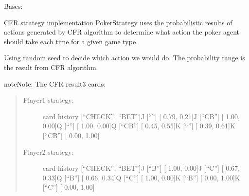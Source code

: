 \documentclass[letterpaper,10pt,english]{sphinxmanual}
\begin{document}
\begin{fulllineitems}
\label{\detokenize{strategy:strategy.agent_strategy.PokerStrategy}}
\pysigstartsignatures
{}
\pysigstopsignatures
\sphinxAtStartPar
Bases: {\hyperref[\detokenize{strategy:strategy.base_strategy.StrategyBase}]{}}

\sphinxAtStartPar
CFR strategy implementation
PokerStrategy uses the probabilistic results of actions generated by CFR algorithm
to determine what action the poker agent should take each time for a given game type.

\begin{fulllineitems}
\label{\detokenize{strategy:strategy.agent_strategy.PokerStrategy.card3strategy}}
\pysigstartsignatures
{}
\pysigstopsignatures
\sphinxAtStartPar
Using random seed to decide which action we would do. The probability range is the result from CFR algorithm.

\begin{sphinxadmonition}{note}{Note:}
\sphinxAtStartPar
The CFR result3 cards:
\begin{quote}
\begin{description}
\item[{Player1 strategy:}] \leavevmode
\sphinxAtStartPar
card    history    {[}“CHECK”, “BET”{]}J       {[}“”{]}       {[}   0.79,  0.21{]}J       {[}“CB”{]}     {[}   1.00,  0.00{]}Q       {[}“”{]}       {[}   1.00,  0.00{]}Q       {[}“CB”{]}     {[}   0.45,  0.55{]}K       {[}“”{]}       {[}   0.39,  0.61{]}K       {[}“CB”{]}     {[}   0.00,  1.00{]}

\item[{Player2 strategy:}] \leavevmode
\sphinxAtStartPar
card    history    {[}“CHECK”, “BET”{]}J       {[}“B”{]}      {[}   1.00,  0.00{]}J       {[}“C”{]}      {[}   0.67,  0.33{]}Q       {[}“B”{]}      {[}   0.66,  0.34{]}Q       {[}“C”{]}      {[}   1.00,  0.00{]}K       {[}“B”{]}      {[}   0.00,  1.00{]}K       {[}“C”{]}      {[}   0.00,  1.00{]}

\end{description}
\end{quote}
\end{sphinxadmonition}


\end{fulllineitems}
\end{fulllineitems}
\end{document}
